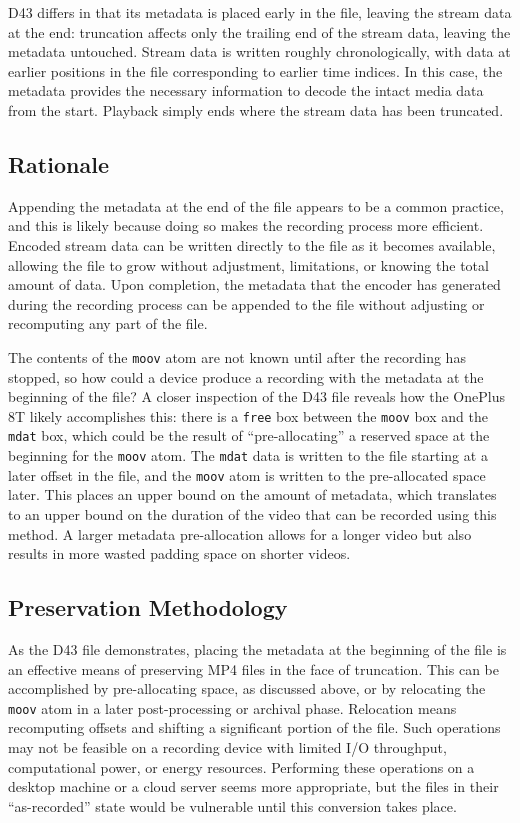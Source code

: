 D43 differs in that its metadata is placed early in the file, leaving the stream data at the end: truncation affects only the trailing end of the stream data, leaving the metadata untouched. Stream data is written roughly chronologically, with data at earlier positions in the file corresponding to earlier time indices. In this case, the metadata provides the necessary information to decode the intact media data from the start. Playback simply ends where the stream data has been truncated.

\subsection{Rationale}

Appending the metadata at the end of the file appears to be a common practice, and this is likely because doing so makes the recording process more efficient. Encoded stream data can be written directly to the file as it becomes available, allowing the file to grow without adjustment, limitations, or knowing the total amount of data. Upon completion, the metadata that the encoder has generated during the recording process can be appended to the file without adjusting or recomputing any part of the file.

The contents of the \texttt{moov} atom are not known until after the recording has stopped, so how could a device produce a recording with the metadata at the beginning of the file? A closer inspection of the D43 file reveals how the OnePlus 8T likely accomplishes this: there is a \texttt{free} box between the \texttt{moov} box and the \texttt{mdat} box, which could be the result of ``pre-allocating'' a reserved space at the beginning for the \texttt{moov} atom. The \texttt{mdat} data is written to the file starting at a later offset in the file, and the \texttt{moov} atom is written to the pre-allocated space later. This places an upper bound on the amount of metadata, which translates to an upper bound on the duration of the video that can be recorded using this method. A larger metadata pre-allocation allows for a longer video but also results in more wasted padding space on shorter videos.

\subsection{Preservation Methodology}

As the D43 file demonstrates, placing the metadata at the beginning of the file is an effective means of preserving MP4 files in the face of truncation. This can be accomplished by pre-allocating space, as discussed above, or by relocating the \texttt{moov} atom in a later post-processing or archival phase. Relocation means recomputing offsets and shifting a significant portion of the file. Such operations may not be feasible on a recording device with limited I/O throughput, computational power, or energy resources. Performing these operations on a desktop machine or a cloud server seems more appropriate, but the files in their ``as-recorded'' state would be vulnerable until this conversion takes place.

